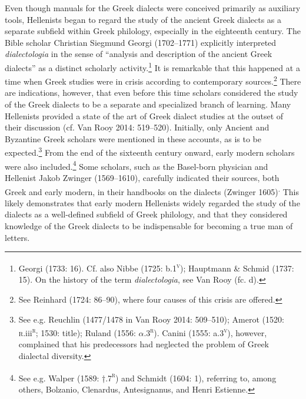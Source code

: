 \documentclass[12pt]{article}
\newcommand\textstyleFootnoteSymbol[1]{\textsuperscript{#1}}
\newenvironment{styleStandard}{\renewcommand\baselinestretch{1.25}\setlength\leftskip{0in}\setlength\rightskip{0in}\setlength\parindent{0.1972in}\setlength\parfillskip{0pt plus 1fil}\setlength\parskip{0in plus 1pt}\writerlistparindent\writerlistleftskip\leavevmode\normalfont\normalsize\writerlistlabel\ignorespaces}{\unskip\vspace{0in plus 1pt}\par}
\newcommand\writerlistleftskip{}
\newcommand\writerlistparindent{}
\newcommand\writerlistlabel{}
\begin{document}
\begin{styleStandard}
Even though manuals for the Greek dialects were conceived primarily as auxiliary tools, Hellenists began to regard the study of the ancient Greek dialects as a separate subfield within Greek philology, especially in the eighteenth century. The Bible scholar Christian Siegmund Georgi (1702–1771) explicitly interpreted \textit{dialectologia} in the sense of “analysis and description of the ancient Greek dialects” as a distinct scholarly activity.\footnote{ Georgi (1733: 16). Cf. also Nibbe (1725: b.1\textsc{\textsuperscript{v}}); Hauptmann \& Schmid (1737: 15). On the history of the term \textit{dialectologia}, see Van Rooy (fc. d).} It is remarkable that this happened at a time when Greek studies were in crisis according to contemporary sources.\footnote{ See Reinhard (1724: 86–90), where four causes of this crisis are offered.} There are indications, however, that even before this time scholars considered the study of the Greek dialects to be a separate and specialized branch of learning. Many Hellenists provided a state of the art of Greek dialect studies at the outset of their discussion (cf. Van Rooy 2014: 519–520). Initially, only Ancient and Byzantine Greek scholars were mentioned in these accounts, as is to be expected.\footnote{ See e.g. Reuchlin (1477/1478 in Van Rooy 2014: 509–510); Amerot (1520: \textsc{r.}iii\textsc{\textsuperscript{r}}\textsc{; 1530: }title); Ruland (1556: $\alpha $.3\textsc{\textsuperscript{r}}). Canini (1555: a.3\textsc{\textsuperscript{v}}), however, complained that his predecessors had neglected the problem of Greek dialectal diversity.} From the end of the sixteenth century onward, early modern scholars were also included.\footnote{ See e.g. Walper (1589: †.7\textsc{\textsuperscript{r}}) and Schmidt (1604: 1), referring to, among others, Bolzanio, Clenardus, Antesignanus, and Henri Estienne.} Some scholars, such as the Basel-born physician and Hellenist Jakob Zwinger (1569–1610), carefully indicated their sources, both Greek and early modern, in their handbooks on the dialects (Zwinger 1605)\textstyleFootnoteSymbol{.} This likely demonstrates that early modern Hellenists widely regarded the study of the dialects as a well-defined subfield of Greek philology, and that they considered knowledge of the Greek dialects to be indispensable for becoming a true man of letters.
\end{styleStandard}
\end{document}
